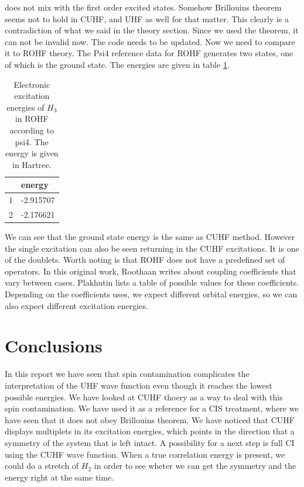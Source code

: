 \documentclass[twoside,twocolumn,9pt]{article}
\renewcommand{\refname}{Notes and references}
\begin{document}
does not mix with the first order excited states. Somehow Brillouins theorem seems not to hold in CUHF, and UHF as well for that matter. This clearly is a contradiction of what we 
said in the theory section. Since we used the theorem, it can not be invalid now. The code needs to be updated. Now we need to compare it to ROHF theory.
The Psi4 reference data for ROHF generates two states, one of which is the ground state. The energies are given in table \ref{tab:ROHF}.
\begin{table}[h]
  \caption{Electronic excitation energies of $H_3$ in ROHF according to psi4. The energy is given in Hartree.}
  \label{tab:ROHF}
  \begin{tabular}{l|l}
      & energy    \\
    \hline
    1 & -2.915707 \\
    2 & -2.176621
  \end{tabular}
\end{table}
We can see that the ground state energy is the same as CUHF method. However the single excitation can also be seen returning in the CUHF excitations. It is one of the doublets.
Worth noting is that ROHF does not have a predefined set of operators. In this original work, Roothaan writes about coupling coefficients that vary between cases\cite{Roothaan1960}.
Plakhutin lists a table of possible values for these coefficients\cite{Plakhutin2014}. Depending on the coefficients uses, we expect different orbital energies, so we can also
expect different excitation energies.


\section{Conclusions}
In this report we have seen that spin contamination complicates the interpretation of the UHF wave function even though it reaches the lowest possible energies. We have looked at
CUHF thoery as a way to deal with this spin contamination. We have used it as a reference for a CIS treatment, where we have seen that it does not obey Brillouins theorem.
We have noticed that CUHF displays multiplets in its excitation energies, which points in the direction that a symmetry of the system that is left intact. A possibility for a
next step is full CI using the CUHF wave function. When a true correlation energy is present, we could do a stretch of $H_2$ in order to see wheter we can get the symmetry and
the energy right at the same time.





\balance


\end{document}
